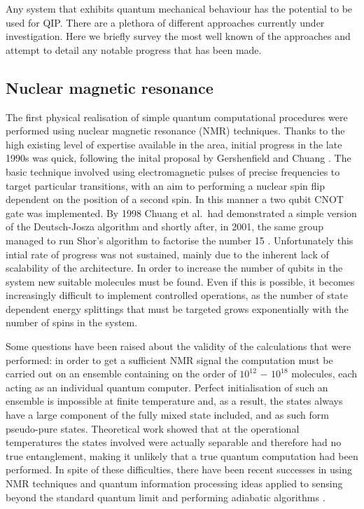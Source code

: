 Any system that exhibits quantum mechanical behaviour has the potential to be used for QIP. There are a plethora of different approaches currently under investigation. Here we briefly survey the most well known of the approaches and attempt to detail any notable progress that has been made.

\subsection{Nuclear magnetic resonance}

The first physical realisation of simple quantum computational procedures were performed using nuclear magnetic resonance (NMR) techniques. Thanks to the high existing level of expertise available in the area, initial progress in the late 1990s was quick, following the inital proposal by Gershenfield and Chuang \cite{nmr_proposal_chuang_97}. The basic technique involved using electromagnetic pulses of precise frequencies to target particular transitions, with an aim to performing a nuclear spin flip dependent on the position of a second spin. In this manner a two qubit CNOT gate was implemented. By 1998 Chuang et al.\ had demonstrated a simple version of the Deutsch-Josza algorithm \cite{chuang_first_nmr_realisation_98} and shortly after, in 2001, the same group managed to run Shor’s algorithm to factorise the number 15 \cite{nmr_factorise_15_01}. Unfortunately this intial rate of progress was not sustained, mainly due to the inherent lack of scalability of the architecture. In order to increase the number of qubits in the system new suitable molecules must be found. Even if this is possible, it becomes increasingly difficult to implement controlled operations, as the number of state dependent energy splittings that must be targeted grows exponentially with the number of spins in the system.

Some questions have been raised about the validity of the calculations that were performed: in order to get a sufficient NMR signal the computation must be carried out on an ensemble containing on the order of $10^12$ − $10^18$ molecules, each acting as an individual quantum computer. Perfect initialisation of such an ensemble is impossible at finite temperature and, as a result, the states always have a large component of the fully mixed state included, and as such form pseudo-pure states. Theoretical work \cite{nmr_pseudo_pure} showed that at the operational temperatures the states involved were actually separable and therefore had no true entanglement, making it unlikely that a true quantum computation had been performed. In spite of these difficulties, there have been recent successes in using NMR techniques and quantum information processing ideas applied to sensing beyond the standard quantum limit \cite{nmr_sensing_09} and performing adiabatic algorithms \cite{nmr_143_factorization}.


